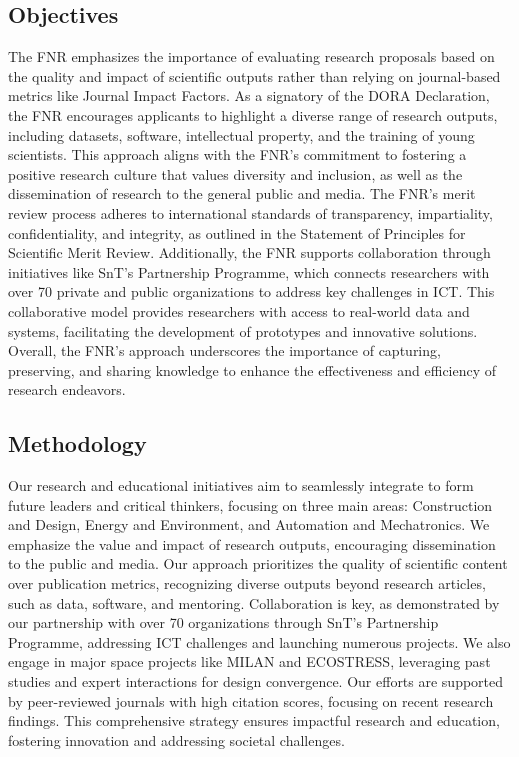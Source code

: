 \documentclass{article}
\begin{document}
\subsection{Objectives}

The FNR emphasizes the importance of evaluating research proposals based on the quality and impact of scientific outputs rather than relying on journal-based metrics like Journal Impact Factors. As a signatory of the DORA Declaration, the FNR encourages applicants to highlight a diverse range of research outputs, including datasets, software, intellectual property, and the training of young scientists. This approach aligns with the FNR's commitment to fostering a positive research culture that values diversity and inclusion, as well as the dissemination of research to the general public and media. The FNR's merit review process adheres to international standards of transparency, impartiality, confidentiality, and integrity, as outlined in the Statement of Principles for Scientific Merit Review. Additionally, the FNR supports collaboration through initiatives like SnT’s Partnership Programme, which connects researchers with over 70 private and public organizations to address key challenges in ICT. This collaborative model provides researchers with access to real-world data and systems, facilitating the development of prototypes and innovative solutions. Overall, the FNR's approach underscores the importance of capturing, preserving, and sharing knowledge to enhance the effectiveness and efficiency of research endeavors.

\subsection{Methodology}

Our research and educational initiatives aim to seamlessly integrate to form future leaders and critical thinkers, focusing on three main areas: Construction and Design, Energy and Environment, and Automation and Mechatronics. We emphasize the value and impact of research outputs, encouraging dissemination to the public and media. Our approach prioritizes the quality of scientific content over publication metrics, recognizing diverse outputs beyond research articles, such as data, software, and mentoring. Collaboration is key, as demonstrated by our partnership with over 70 organizations through SnT’s Partnership Programme, addressing ICT challenges and launching numerous projects. We also engage in major space projects like MILAN and ECOSTRESS, leveraging past studies and expert interactions for design convergence. Our efforts are supported by peer-reviewed journals with high citation scores, focusing on recent research findings. This comprehensive strategy ensures impactful research and education, fostering innovation and addressing societal challenges.
\end{document}
